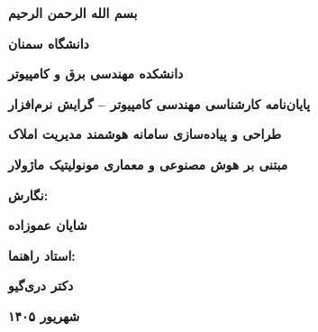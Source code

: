 \documentclass[11pt, a4paper]{report}
\begin{document}
\clearpage
\thispagestyle{empty}
\mbox{}

\clearpage
\thispagestyle{empty}
\vspace*{7cm}
\begin{center}
    {\Huge \bfseries بسم الله الرحمن الرحیم}
\end{center}

\clearpage
\begin{titlepage}
    \centering
    \vspace*{0.5cm}

    \begin{figure}[h]
      \centering
    \end{figure}
    \vspace{0.3cm}
    {\LARGE \bfseries دانشگاه سمنان \par}
    \vspace{0.5cm}
    {\large \bfseries دانشکده مهندسی برق و کامپیوتر \par}
    \vspace{1.5cm}
    {\normalsize \bfseries پایان‌نامه کارشناسی مهندسی کامپیوتر -- گرایش نرم‌افزار \par}
    \vspace{1.8cm}
    {\huge \bfseries طراحی و پیاده‌سازی سامانه هوشمند مدیریت املاک \par}
    \vspace{0.4cm}
    {\large \bfseries مبتنی بر هوش مصنوعی و معماری مونولیتیک ماژولار \par}
    \vspace{2.2cm}
    {\normalsize \bfseries نگارش: \par}
    {\Large \bfseries شایان عموزاده \par}
    \vspace{1.5cm}
    {\normalsize \bfseries استاد راهنما: \par}
    {\Large \bfseries دکتر دری‌گیو \par}
    \vfill
    {\normalsize \bfseries شهریور ۱۴۰۵ \par}
\end{titlepage}
\end{document}
